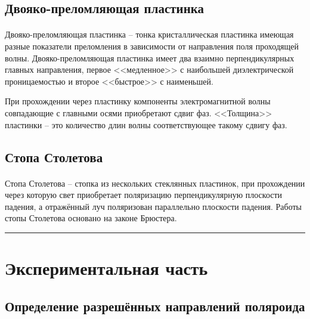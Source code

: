 \documentclass[a4paper,12pt]{article} %
\begin{document}
\subsection{Двояко-преломляющая пластинка}

\paragraph{} Двояко-преломляющая пластинка -- тонка кристаллическая пластинка имеющая разные показатели преломления в зависимости от направления поля проходящей волны. Двояко-преломляющая пластинка имеет два взаимно перпендикулярных главных направления, первое <<медленное>> с наибольшей диэлектрической проницаемостью и второе <<быстрое>> с наименьшей.

При прохождении через пластинку компоненты электромагнитной волны совпадающие с главными осями приобретают сдвиг фаз. <<Толщина>> пластинки -- это количество длин волны соответствующее такому сдвигу фаз.

\subsection{Стопа Столетова}

\paragraph{} Стопа Столетова -- стопка из нескольких стеклянных пластинок, при прохождении через которую свет приобретает поляризацию перпендикулярную плоскости падения, а отражённый луч поляризован параллельно плоскости падения. Работы стопы Столетова основано на законе Брюстера.

\medskip\hrule\medskip

\section{Экспериментальная часть}

\subsection{Определение разрешённых направлений поляроида}
\end{document}
